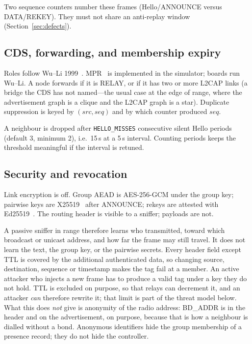 \documentclass[conference,10pt]{IEEEtran}
\begin{document}
Two sequence counters number these frames (Hello/ANNOUNCE versus
DATA/REKEY). They must not share an anti-replay window
(Section~\ref{sec:defects}).

\subsection{CDS, forwarding, and membership expiry}

Roles follow Wu--Li 1999~\cite{wuli1999}. MPR~\cite{qayyum2002} is
implemented in the simulator; boards run Wu--Li. A node forwards if it is
RELAY, or if it has two or more L2CAP links (a bridge the CDS has not
named---the usual case at the edge of range, where the advertisement
graph is a clique and the L2CAP graph is a star). Duplicate suppression
is keyed by $(\mathit{src},\mathit{seq})$ and by which counter produced
$\mathit{seq}$.

A neighbour is dropped after \texttt{HELLO\_MISSES} consecutive silent
Hello periods (default 3, minimum 2), i.e.\ 15\,s at a 5\,s interval.
Counting periods keeps the threshold meaningful if the interval is
retuned.

\subsection{Security and revocation}
\label{sec:security}

Link encryption is off. Group AEAD is AES-256-GCM under the group key;
pairwise keys are X25519~\cite{rfc7748} after ANNOUNCE; rekeys are
attested with Ed25519~\cite{rfc8032}. The routing header is visible to a
sniffer; payloads are not.

A passive sniffer in range therefore learns who transmitted, toward
which broadcast or unicast address, and how far the frame may still
travel. It does not learn the text, the group key, or the pairwise
secrets. Every header field except TTL is covered by the additional
authenticated data, so changing source, destination, sequence or
timestamp makes the tag fail at a member. An active attacker who injects
a new frame has to produce a valid tag under a key they do not hold. TTL
is excluded on purpose, so that relays can decrement it, and an attacker
\emph{can} therefore rewrite it; that limit is part of the threat model
below. What this does
\emph{not} give is anonymity of the radio address: BD\_ADDR is in the
header and on the advertisement, on purpose, because that is how a
neighbour is dialled without a bond. Anonymous identifiers hide the
group membership of a presence record; they do not hide the controller.
\end{document}

